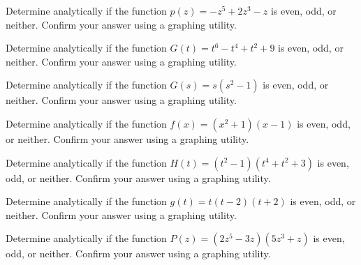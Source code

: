 \documentclass{ximera}
\begin{document}
\begin{problem}
Determine analytically if the function $p(z) = -z^5 + 2z^3 - z$ is even, odd, or neither.  Confirm your answer using a graphing utility.  


\end{problem} 

\begin{problem}
Determine analytically if the function $G(t) = t^{6} - t^{4} + t^{2} + 9$ is even, odd, or neither.  Confirm your answer using a graphing utility.  

\end{problem} 
 
\begin{problem}
Determine analytically if the function $G(s) = s(s^2 - 1)$ is even, odd, or neither.  Confirm your answer using a graphing utility.  


\end{problem} 

\begin{problem}
Determine analytically if the function $f(x) = (x^2+1)(x-1)$ is even, odd, or neither.  Confirm your answer using a graphing utility.  

\end{problem}

\begin{problem}
Determine analytically if the function $H(t) = (t^2-1)(t^4+t^2+3)$ is even, odd, or neither.  Confirm your answer using a graphing utility.  


\end{problem}

\begin{problem}
Determine analytically if the function $g(t) = t(t-2)(t+2)$ is even, odd, or neither.  Confirm your answer using a graphing utility. 

\end{problem}

\begin{problem}
Determine analytically if the function $P(z) = (2z^{5} - 3z)(5z^3+z)$ is even, odd, or neither.  Confirm your answer using a graphing utility.  


\end{problem}
 
\end{document}
